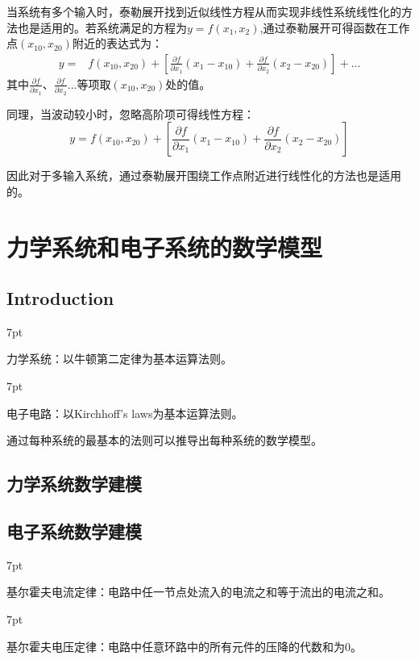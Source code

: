 \documentclass{article}
\numberwithin{equation}{section}
\numberwithin{figure}{section}
\newenvironment{formal}{%
\def\FrameCommand{%
\hspace{1pt}%
{\color{DarkBlue}\vrule width 2pt}%
{\color{formalshade}\vrule width 4pt}%
\colorbox{formalshade}%
}%
\MakeFramed{\advance\hsize-\width\FrameRestore}%
\noindent\hspace{-4.55pt}%
\begin{adjustwidth}{}{7pt}%
\vspace{2pt}\vspace{2pt}%
}
{%
\vspace{2pt}\end{adjustwidth}\endMakeFramed%
}
\begin{document}
当系统有多个输入时，泰勒展开找到近似线性方程从而实现非线性系统线性化的方法也是适用的。若系统满足的方程为$y=f(x_1,x_2)$,通过泰勒展开可得函数在工作点$(x_{10},x_{20})$附近的表达式为：
\begin{equation}
    \begin{split}
        y=&f(x_{10},x_{20})+[\frac{\partial f}{\partial x_1}(x_1-x_{10})+\frac{\partial f}{\partial x_2}(x_2-x_{20})]+...
    \end{split}
\end{equation}
其中$\frac{\partial f}{\partial x_1}、\frac{\partial f}{\partial x_2}...$等项取$(x_{10},x_{20})$处的值。

同理，当波动较小时，忽略高阶项可得线性方程：
\begin{equation}
    y=f(x_{10},x_{20})+[\frac{\partial f}{\partial x_1}(x_1-x_{10})+\frac{\partial f}{\partial x_2}(x_2-x_{20})]
\end{equation}

因此对于多输入系统，通过泰勒展开围绕工作点附近进行线性化的方法也是适用的。

\section{力学系统和电子系统的数学模型}
\subsection{Introduction}
\begin{formal}
    力学系统：以牛顿第二定律为基本运算法则。
\end{formal}

\begin{formal}
    电子电路：以Kirchhoff's laws为基本运算法则。
\end{formal}
    通过每种系统的最基本的法则可以推导出每种系统的数学模型。

\subsection{力学系统数学建模}

\subsection{电子系统数学建模}
\begin{formal}
    基尔霍夫电流定律：电路中任一节点处流入的电流之和等于流出的电流之和。
\end{formal}

\begin{formal}
    基尔霍夫电压定律：电路中任意环路中的所有元件的压降的代数和为0。
\end{formal}
\end{document}
